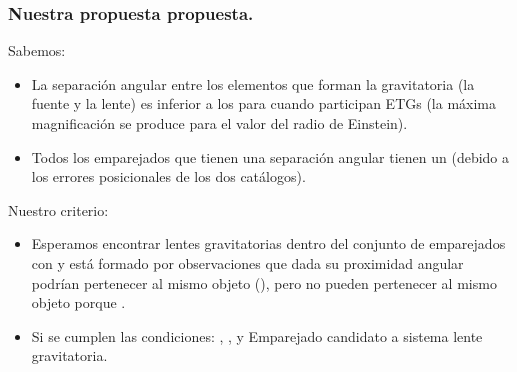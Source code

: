 \documentclass[8pt]{beamer}
\begin{document}
\begin{frame}

\frametitle{Nuestra propuesta propuesta.}

Sabemos:

\begin{itemize}
     
\item La separación angular entre los elementos que forman la gravitatoria (la fuente y la lente) es inferior a los  para cuando participan ETGs (la máxima magnificación se produce para el valor del radio de Einstein).

\item Todos los emparejados que tienen una separación angular  tienen un  (debido a los errores posicionales de los dos catálogos).

\end{itemize}

\vspace{3mm}

Nuestro criterio:

\begin{itemize}
\item Esperamos encontrar lentes gravitatorias dentro del conjunto de emparejados con  y  está formado por observaciones que dada su proximidad angular podrían pertenecer al mismo objeto (), pero no pueden pertenecer al mismo objeto porque .

\item Si se cumplen las condiciones: , ,  y  \maths{\implies} Emparejado candidato a sistema lente gravitatoria.

\end{itemize}

\end{frame}
\end{document}
